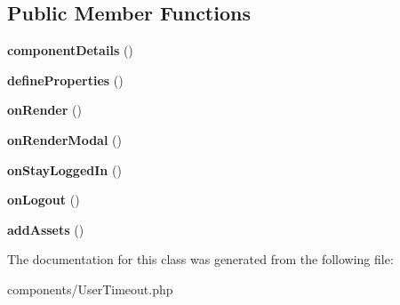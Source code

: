 \subsection*{Public Member Functions}
\begin{DoxyCompactItemize}
\item 
\hypertarget{classDMA_1_1Friends_1_1Components_1_1UserTimeout_aac849ff575a50043a1eb1c7fbccbc39d}{{\bfseries component\+Details} ()}\label{classDMA_1_1Friends_1_1Components_1_1UserTimeout_aac849ff575a50043a1eb1c7fbccbc39d}

\item 
\hypertarget{classDMA_1_1Friends_1_1Components_1_1UserTimeout_ab9a27c670f3bc34a2390723241f534b9}{{\bfseries define\+Properties} ()}\label{classDMA_1_1Friends_1_1Components_1_1UserTimeout_ab9a27c670f3bc34a2390723241f534b9}

\item 
\hypertarget{classDMA_1_1Friends_1_1Components_1_1UserTimeout_a0ef7c55f77dae39349bead8a5dc3dec8}{{\bfseries on\+Render} ()}\label{classDMA_1_1Friends_1_1Components_1_1UserTimeout_a0ef7c55f77dae39349bead8a5dc3dec8}

\item 
\hypertarget{classDMA_1_1Friends_1_1Components_1_1UserTimeout_a72aadb5d8be4a28cb77064843c0e3fe5}{{\bfseries on\+Render\+Modal} ()}\label{classDMA_1_1Friends_1_1Components_1_1UserTimeout_a72aadb5d8be4a28cb77064843c0e3fe5}

\item 
\hypertarget{classDMA_1_1Friends_1_1Components_1_1UserTimeout_a505b6eeb392b50007e1ddb74d0390184}{{\bfseries on\+Stay\+Logged\+In} ()}\label{classDMA_1_1Friends_1_1Components_1_1UserTimeout_a505b6eeb392b50007e1ddb74d0390184}

\item 
\hypertarget{classDMA_1_1Friends_1_1Components_1_1UserTimeout_a95c6498fa80a4c35cca3dc7e276d79e6}{{\bfseries on\+Logout} ()}\label{classDMA_1_1Friends_1_1Components_1_1UserTimeout_a95c6498fa80a4c35cca3dc7e276d79e6}

\item 
\hypertarget{classDMA_1_1Friends_1_1Components_1_1UserTimeout_a1b3f9633922c389243b154e2cfa90899}{{\bfseries add\+Assets} ()}\label{classDMA_1_1Friends_1_1Components_1_1UserTimeout_a1b3f9633922c389243b154e2cfa90899}

\end{DoxyCompactItemize}


The documentation for this class was generated from the following file\+:\begin{DoxyCompactItemize}
\item 
components/User\+Timeout.\+php\end{DoxyCompactItemize}
